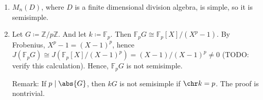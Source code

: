 \begin{enumerate}
	\item $M_n(D)$, where $D$ is a finite dimensional division algebra, is
		simple, so it is semisimple.
	\item Let $G\coloneqq \mathbb{Z}/p\mathbb{Z}$. And let $k\coloneqq \mathbb{F}_p$.
		Then $\mathbb{F}_pG\cong \mathbb{F}_p[X]/(X^p-1)$. By Frobenius,
		$X^p - 1 = (X-1)^p$, hence
		$J(\mathbb{F}_pG)\cong J(\mathbb{F}_p[X]/(X-1)^p) = (X-1)/(X-1)^p\neq 0$
		(TODO: verify this calculation). Hence, $\mathbb{F}_pG$ is not semisimple.

		Remark: If $p\mid \abs{G}$, then $kG$ is not semisimple if $\chr k = p$.
		The proof is nontrivial.
\end{enumerate}
